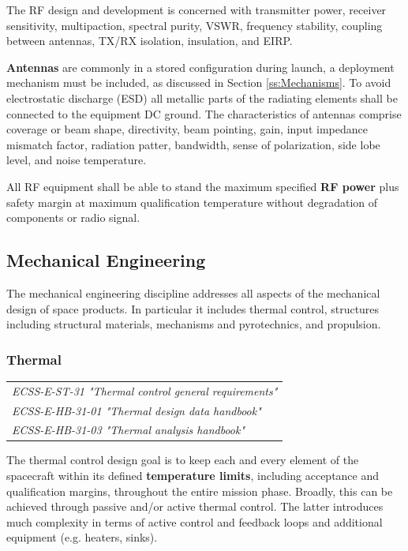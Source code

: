 The RF design and development is concerned with transmitter power, receiver sensitivity, multipaction, spectral purity, VSWR, frequency stability, coupling between antennas, TX/RX isolation, insulation, and EIRP.

\textbf{Antennas} are commonly in a stored configuration during launch, a deployment mechanism must be included, as discussed in Section \ref{ss:Mechanisms}. To avoid electrostatic discharge (ESD) all metallic parts of the radiating elements shall be connected to the equipment DC ground. The characteristics of antennas comprise coverage or beam shape, directivity, beam pointing, gain, input impedance mismatch factor, radiation patter, bandwidth, sense of polarization, side lobe level, and noise temperature.

All RF equipment shall be able to stand the maximum specified \textbf{RF power} plus safety margin at maximum qualification temperature without degradation of components or radio signal. 

\subsection{Mechanical Engineering}
\label{ss:Mechanical Engineering}

The mechanical engineering discipline addresses all aspects of the mechanical design of space products. In particular it includes thermal control, structures including structural materials, mechanisms and pyrotechnics, and propulsion.

\subsubsection{Thermal}

\begin{tabular}{l}
\textit{ECSS-E-ST-31 "Thermal control general requirements" \cite{ECSS-E-ST-31}} \\
\textit{ECSS-E-HB-31-01 "Thermal design data handbook" \cite{ECSS-E-HB-31-01}} \\
\textit{ECSS-E-HB-31-03 "Thermal analysis handbook" \cite{ECSS-E-HB-31-01}}
\end{tabular}

The thermal control design goal is to keep each and every element of the spacecraft within its defined \textbf{temperature limits}, including acceptance and qualification margins, throughout the entire mission phase. Broadly, this can be achieved through passive and/or active thermal control. The latter introduces much complexity in terms of active control and feedback loops and additional equipment (e.g. heaters, sinks).

